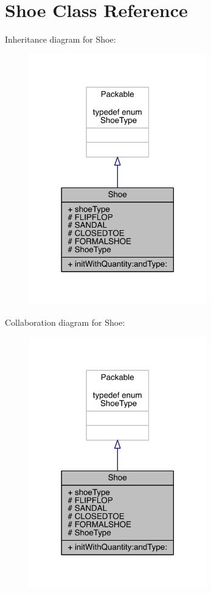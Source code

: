 \hypertarget{interface_shoe}{\section{Shoe Class Reference}
\label{interface_shoe}
}


Inheritance diagram for Shoe\-:\nopagebreak
\begin{figure}[H]
\begin{center}
\leavevmode
\includegraphics[width=218pt]{interface_shoe__inherit__graph}
\end{center}
\end{figure}


Collaboration diagram for Shoe\-:\nopagebreak
\begin{figure}[H]
\begin{center}
\leavevmode
\includegraphics[width=218pt]{interface_shoe__coll__graph}
\end{center}
\end{figure}
